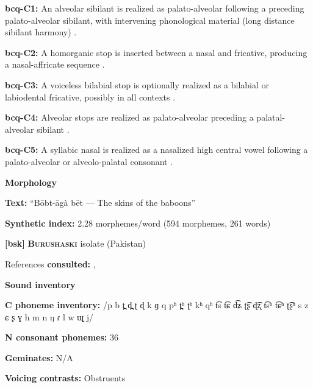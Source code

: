\textbf{bcq-C1:} An alveolar sibilant is realized as palato-alveolar following a preceding palato-alveolar sibilant, with intervening phonological material (long distance sibilant harmony) \citep[67]{Rapold2006}.



\textbf{bcq-C2:} A homorganic stop is inserted between a nasal and fricative, producing a nasal-affricate sequence \citep[69]{Rapold2006}.



\textbf{bcq-C3:} A voiceless bilabial stop is optionally realized as a bilabial or labiodental fricative, possibly in all contexts \citep[73]{Rapold2006}.



\textbf{bcq-C4:} Alveolar stops are realized as palato-alveolar preceding a palatal-alveolar sibilant \citep[74]{Rapold2006}.



\textbf{bcq-C5:} A syllabic nasal is realized as a nasalized high central vowel following a palato-alveolar or alveolo-palatal consonant \citep[76]{Rapold2006}.



\textbf{Morphology}



\textbf{Text:} “Bōbt-āgà bēt — The skins of the baboons” \citep[594-599]{Rapold2006}



\textbf{Synthetic index:} 2.28 morphemes/word (594 morphemes, 261 words)



\textbf{[bsk]}   \textbf{\textsc{Burushaski}}  isolate (Pakistan)



References \textbf{consulted:} \citet{Anderson1997}, \citet{Yoshioka2012}



\textbf{Sound inventory}



\textbf{C phoneme inventory:} /p b t̪ d̪ ʈ ɖ k ɡ q pʰ t̪ʰ ʈʰ kʰ qʰ t͡s t͡ɕ d͡ʑ ʈ͡ʂ ɖ͡ʐ t͡sʰ t͡ɕʰ ʈ͡ʂʰ s z ɕ ʂ ɣ h m n ŋ ɾ l w ɰ̟ j/



\textbf{N consonant phonemes:} 36



\textbf{Geminates:} N/A



\textbf{Voicing contrasts:} Obstruents



